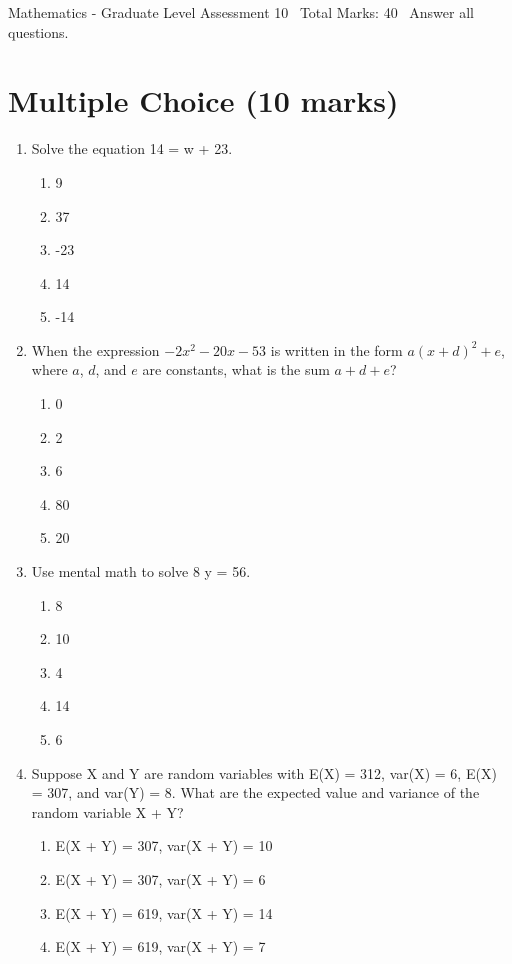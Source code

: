 \documentclass[12pt]{article}
\begin{document}
\begin{center}
Mathematics - Graduate Level Assessment 10 \
Total Marks: 40 \
Answer all questions.
\end{center}

\section*{Multiple Choice (10 marks)}
\begin{enumerate}[label=\arabic*.]
\item Solve the equation 14 = w + 23.
\begin{enumerate}[label=(\alph*)]
    \item 9
    \item 37
    \item -23
    \item 14
    \item -14
\end{enumerate}
\item When the expression $-2 x^2-20 x-53$ is written in the form $a(x+d)^2+e$, where $a$, $d$, and $e$ are constants, what is the sum $a+d+e$?
\begin{enumerate}[label=(\alph*)]
    \item 0
    \item 2
    \item 6
    \item 80
    \item 20
\end{enumerate}
\item Use mental math to solve 8 y = 56.
\begin{enumerate}[label=(\alph*)]
    \item 8
    \item 10
    \item 4
    \item 14
    \item 6
\end{enumerate}
\item Suppose X and Y are random variables with E(X) = 312, var(X) = 6, E(X) = 307, and var(Y) = 8. What are the expected value and variance of the random variable X + Y?
\begin{enumerate}[label=(\alph*)]
    \item E(X + Y) = 307, var(X + Y) = 10
    \item E(X + Y) = 307, var(X + Y) = 6
    \item E(X + Y) = 619, var(X + Y) = 14
    \item E(X + Y) = 619, var(X + Y) = 7

\end{enumerate}
\end{enumerate}
\end{document}

